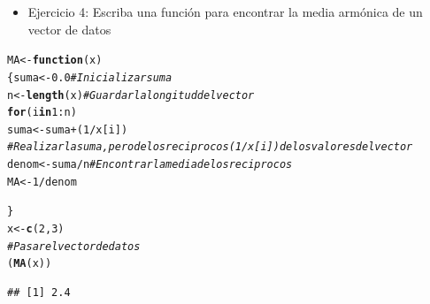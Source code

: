 \documentclass[12pt,letterpaper]{article}\usepackage[]{graphicx}\usepackage[]{color}
\makeatletter
\newcommand{\hlnum}[1]{\textcolor[rgb]{0.686,0.059,0.569}{#1}}%
\newcommand{\hlcom}[1]{\textcolor[rgb]{0.678,0.584,0.686}{\textit{#1}}}%
\newcommand{\hlopt}[1]{\textcolor[rgb]{0,0,0}{#1}}%
\newcommand{\hlstd}[1]{\textcolor[rgb]{0.345,0.345,0.345}{#1}}%
\newcommand{\hlkwa}[1]{\textcolor[rgb]{0.161,0.373,0.58}{\textbf{#1}}}%
\newcommand{\hlkwb}[1]{\textcolor[rgb]{0.69,0.353,0.396}{#1}}%
\newcommand{\hlkwc}[1]{\textcolor[rgb]{0.333,0.667,0.333}{#1}}%
\newcommand{\hlkwd}[1]{\textcolor[rgb]{0.737,0.353,0.396}{\textbf{#1}}}%
\newenvironment{kframe}{%
 \def\at@end@of@kframe{}%
 \ifinner\ifhmode%
  \def\at@end@of@kframe{\end{minipage}}%
  \begin{minipage}{\columnwidth}%
 \fi\fi%
 \def\FrameCommand##1{\hskip\@totalleftmargin \hskip-\fboxsep
 \colorbox{shadecolor}{##1}\hskip-\fboxsep
     \hskip-\linewidth \hskip-\@totalleftmargin \hskip\columnwidth}%
 \MakeFramed {\advance\hsize-\width
   \@totalleftmargin\z@ \linewidth\hsize
   \@setminipage}}%
 {\par\unskip\endMakeFramed%
 \at@end@of@kframe}
\newenvironment{knitrout}{}{} %
\makeatother
\begin{document}
\newpage
\begin{itemize}
\item Ejercicio 4: Escriba una funci\'on para encontrar la media arm\'onica de un vector de datos
\end{itemize}
\begin{knitrout}
\color{fgcolor}\begin{kframe}
\begin{alltt}
\hlstd{MA} \hlkwb{<-} \hlkwa{function}\hlstd{(}\hlkwc{x}\hlstd{)}
  \hlstd{\{suma} \hlkwb{<-} \hlnum{0.0} \hlcom{# Inicializar suma}
  \hlstd{n} \hlkwb{<-} \hlkwd{length}\hlstd{(x)} \hlcom{# Guardar la longitud del vector}
  \hlkwa{for}\hlstd{(i} \hlkwa{in} \hlnum{1}\hlopt{:}\hlstd{n)}
    \hlstd{suma} \hlkwb{<-} \hlstd{suma} \hlopt{+} \hlstd{(}\hlnum{1}\hlopt{/}\hlstd{x[i])}
  \hlcom{# Realizar la suma, pero de los reciprocos (1/x[i]) de los valores del vector}
  \hlstd{denom} \hlkwb{<-} \hlstd{suma}\hlopt{/}\hlstd{n} \hlcom{# Encontrar la media de los reciprocos}
  \hlstd{MA}\hlkwb{<-}\hlnum{1}\hlopt{/}\hlstd{denom}

\hlstd{\}}
\hlstd{x} \hlkwb{<-} \hlkwd{c}\hlstd{(}\hlnum{2}\hlstd{,}\hlnum{3}\hlstd{)}
\hlcom{# Pasar el vector de datos}
\hlstd{(}\hlkwd{MA}\hlstd{(x))}
\end{alltt}
\begin{verbatim}
## [1] 2.4
\end{verbatim}
\end{kframe}
\end{knitrout}
\end{document}
